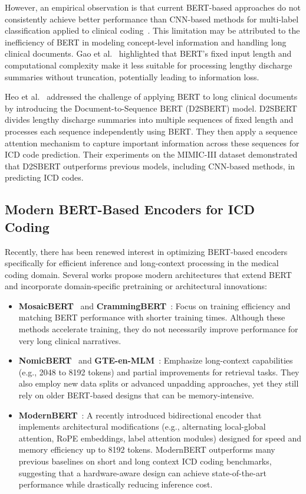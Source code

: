 \documentclass[12pt,a4paper]{report}
\begin{document}
However, an empirical observation is that current BERT-based approaches do not consistently achieve better performance than CNN-based methods for multi-label classification applied to clinical coding~\cite{dong2022automated, gao2021limitations}. This limitation may be attributed to the inefficiency of BERT in modeling concept-level information and handling long clinical documents. Gao et al.~\cite{gao2021limitations} highlighted that BERT's fixed input length and computational complexity make it less suitable for processing lengthy discharge summaries without truncation, potentially leading to information loss.

Heo et al.~\cite{heo2022medical} addressed the challenge of applying BERT to long clinical documents by introducing the Document-to-Sequence BERT (D2SBERT) model. D2SBERT divides lengthy discharge summaries into multiple sequences of fixed length and processes each sequence independently using BERT. They then apply a sequence attention mechanism to capture important information across these sequences for ICD code prediction. Their experiments on the MIMIC-III dataset demonstrated that D2SBERT outperforms previous models, including CNN-based methods, in predicting ICD codes.

\subsection{Modern BERT-Based Encoders for ICD Coding}
Recently, there has been renewed interest in optimizing BERT-based encoders specifically for efficient inference and long-context processing in the medical coding domain. Several works propose modern architectures that extend BERT and incorporate domain-specific pretraining or architectural innovations:

\begin{itemize}
    \item \textbf{MosaicBERT}~\cite{portes2023mosaicbert} and \textbf{CrammingBERT}~\cite{geiping2023cramming}: Focus on training efficiency and matching BERT performance with shorter training times. Although these methods accelerate training, they do not necessarily improve performance for very long clinical narratives.

    \item \textbf{NomicBERT}~\cite{nussbaum2024nomicbert} and \textbf{GTE-en-MLM}~\cite{zhang2024gte}: Emphasize long-context capabilities (e.g., 2048 to 8192 tokens) and partial improvements for retrieval tasks. They also employ new data splits or advanced unpadding approaches, yet they still rely on older BERT-based designs that can be memory-intensive.

    \item \textbf{ModernBERT}~\cite{warner2024modernbert}: A recently introduced bidirectional encoder that implements architectural modifications (e.g., alternating local-global attention, RoPE embeddings, label attention modules) designed for speed and memory efficiency up to 8192 tokens. ModernBERT outperforms many previous baselines on short and long context ICD coding benchmarks, suggesting that a hardware-aware design can achieve state-of-the-art performance while drastically reducing inference cost.
\end{itemize}
\end{document}

